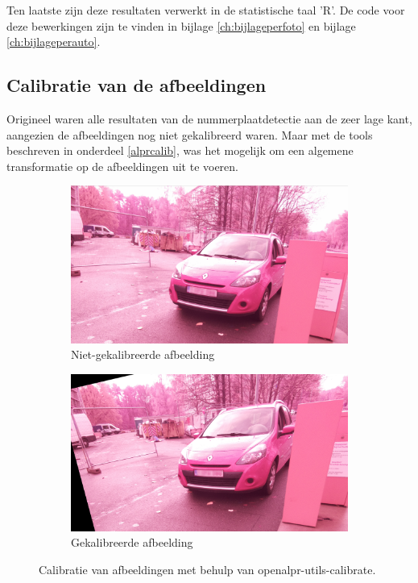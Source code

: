 Ten laatste zijn deze resultaten verwerkt in de statistische taal 'R'. De code voor deze bewerkingen zijn te vinden in bijlage \ref{ch:bijlageperfoto} en bijlage \ref{ch:bijlageperauto}.

\subsection{Calibratie van de afbeeldingen}
Origineel waren alle resultaten van de nummerplaatdetectie aan de zeer lage kant, aangezien de afbeeldingen nog niet gekalibreerd waren. Maar met de tools beschreven in onderdeel \ref{alprcalib}, was het mogelijk om een algemene transformatie op de afbeeldingen uit te voeren.
\begin{figure}[h!]
	\centering
	\begin{subfigure}[b]{0.4\linewidth}
		\includegraphics[width=\linewidth]{img/calibration/pre-calibrate.png}
		\caption{Niet-gekalibreerde afbeelding}
	\end{subfigure}
	\begin{subfigure}[b]{0.4\linewidth}
		\includegraphics[width=\linewidth]{img/calibration/calibrate-cut.png}
		\caption{Gekalibreerde afbeelding}
	\end{subfigure}
	\label{fig:calibration}
	\caption{Calibratie van afbeeldingen met behulp van openalpr-utils-calibrate.}
\end{figure}

